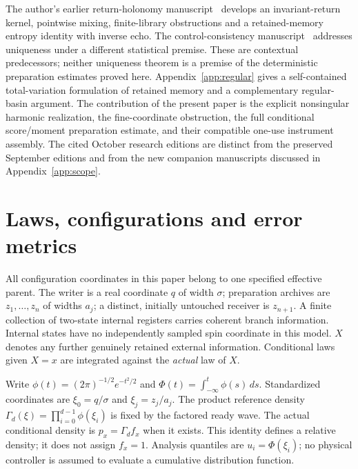 \documentclass[11pt]{article}
\numberwithin{equation}{section}
\theoremstyle{definition}
\theoremstyle{remark}
\begin{document}
The author's earlier return-holonomy manuscript~\cite{RodgersReturn2026} develops an invariant-return kernel, pointwise mixing, finite-library obstructions and a retained-memory entropy identity with inverse echo. The control-consistency manuscript~\cite{RodgersControl2026} addresses uniqueness under a different statistical premise. These are contextual predecessors; neither uniqueness theorem is a premise of the deterministic preparation estimates proved here. Appendix~\ref{app:regular} gives a self-contained total-variation formulation of retained memory and a complementary regular-basin argument. The contribution of the present paper is the explicit nonsingular harmonic realization, the fine-coordinate obstruction, the full conditional score/moment preparation estimate, and their compatible one-use instrument assembly. The cited October research editions are distinct from the preserved September editions and from the new companion manuscripts discussed in Appendix~\ref{app:scope}.

\section{Laws, configurations and error metrics}\label{sec:notation}
All configuration coordinates in this paper belong to one specified effective parent. The writer is a real coordinate $q$ of width $\sigma$; preparation archives are $z_1,\ldots,z_n$ of widths $a_j$; a distinct, initially untouched receiver is $z_{n+1}$. A finite collection of two-state internal registers carries coherent branch information. Internal states have no independently sampled spin coordinate in this model. $X$ denotes any further genuinely retained external information. Conditional laws given $X=x$ are integrated against the \emph{actual} law of $X$.

Write $\phi(t)=(2\pi)^{-1/2}e^{-t^2/2}$ and $\Phi(t)=\int_{-\infty}^t\phi(s)\,ds$. Standardized coordinates are $\xi_0=q/\sigma$ and $\xi_j=z_j/a_j$. The product reference density $\Gamma_d(\xi)=\prod_{i=0}^{d-1}\phi(\xi_i)$ is fixed by the factored ready wave. The actual conditional density is $p_x=\Gamma_d f_x$ when it exists. This identity defines a relative density; it does not assign $f_x=1$. Analysis quantiles are $u_i=\Phi(\xi_i)$; no physical controller is assumed to evaluate a cumulative distribution function.
\end{document}
